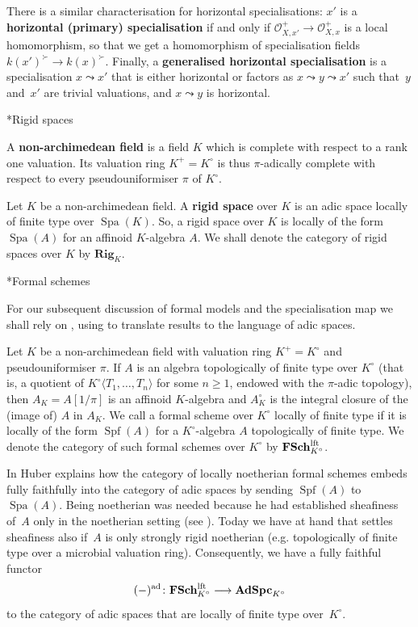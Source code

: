 \documentclass[a4paper,twoside,11pt,reqno]{amsart}
\makeatletter
\newcommand{\cO}{{\mathcal O}}
\DeclareMathOperator{\Spf}{Spf}
\DeclareMathOperator{\Spa}{Spa}
\newcommand{\cat}[1]{\mathbf{#1}}
\def\subsubsection{\@startsection{subsubsection}{3}%
      \z@{.5\linespacing\@plus.7\linespacing}{-.5em}%
      {\normalfont\bfseries}}
\theoremstyle{definition}
\numberwithin{equation}{subsection}
\makeatother
\begin{document}
There is a similar characterisation for horizontal specialisations: $x'$ is a {\bf horizontal (primary) specialisation} if and only if $\cO_{X,x'}^+\to\cO^+_{X, x}$ is a local homomorphism, so that we get a homomorphism of specialisation fields $k(x')^\succ \to k(x)^\succ$.
Finally, a {\bf generalised horizontal specialisation} is a specialisation $x \leadsto x'$ that is either horizontal or factors as $x \leadsto y \leadsto x'$ such that~$y$ and~$x'$ are trivial valuations, and $x \leadsto y$ is horizontal.


\subsubsection*{Rigid spaces}

A {\bf non-archimedean field} is a field $K$ which is complete with respect to a rank one valuation. Its valuation ring $K^+ = K^\circ$ is thus $\pi$-adically complete with respect to every pseudouniformiser $\pi$ of $K^\circ$.

Let $K$ be a non-archimedean field. A {\bf rigid space} over $K$ is an adic space locally of finite type over $\Spa(K)$. So, a rigid space over $K$ is locally of the form $\Spa(A)$ for an affinoid $K$-algebra $A$. We shall denote the category of rigid spaces over $K$ by $\cat{Rig}_K$.


\subsubsection*{Formal schemes}

For our subsequent discussion of formal models and the specialisation map we shall rely on \cite{FujiwaraKato}, using \cite[Theorem~II~A.5.1]{FujiwaraKato} to translate results to the language of adic spaces.

Let $K$ be a non-archimedean field with valuation ring $K^+=K^\circ$ and pseudouniformiser $\pi$. If $A$ is an algebra topologically of finite type over $K^\circ$ (that is, a quotient of $K^\circ\langle T_1, \ldots, T_n\rangle$ for some $n\geq 1$, endowed with the $\pi$-adic topology), then $A_K = A[1/\pi]$ is an affinoid $K$-algebra and $A_K^\circ$ is the integral closure of the (image of) $A$ in $A_K$. We call a formal scheme over $K^\circ$ locally of finite type if it is locally of the form $\Spf(A)$ for a $K^\circ$-algebra $A$ topologically of finite type. We denote the category of such formal schemes over $K^\circ$ by $\cat{FSch}^{\rm lft}_{K^\circ}$. 

In \cite[\S~4]{Huber94:Generalization} Huber explains how the category of locally noetherian formal schemes embeds fully faithfully into the category of adic spaces by sending $\Spf(A)$ to $\Spa(A)$.
Being noetherian was needed because he had established sheafiness of~$A$ only in the noetherian setting (see \cite[Theorem~2.2]{Huber94:Generalization}).
Today we have \cite{ZavyalovSheafy} at hand that settles sheafiness also if~$A$ is only strongly rigid noetherian (e.g. topologically of finite type over a microbial valuation ring).
Consequently, we have a fully faithful functor
\[
    (-)^{\rm ad} \colon \cat{FSch}^{\rm lft}_{K^\circ} \longrightarrow \cat{AdSpc}_{K^\circ}
\]
to the category of adic spaces that are locally of finite type over~$K^\circ$.
\end{document}
